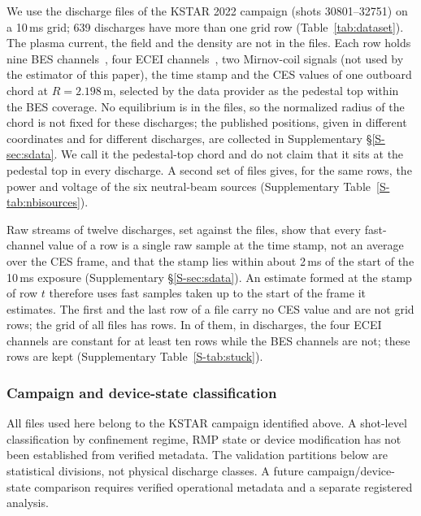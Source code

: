 \documentclass[11pt,a4paper]{article}
\newcommand{\Supp}[1]{Supplementary \S\ref{S-#1}}
\newcommand{\SuppTab}[1]{Supplementary Table~\ref{S-#1}}
\begin{document}
We use the \NFiles{} discharge files of the KSTAR 2022 campaign (shots 30801--32751) on a 10\,ms grid; 639 discharges have more than one grid row (Table~\ref{tab:dataset}). The plasma current, the field and the density are not in the files. Each row holds nine BES channels~\citep{Lampert2015CombinedHydrogen,KFE2026DiagnosticsDataUserGuide}, four ECEI channels~\citep{Yun2010DevelopmentKstar}, two Mirnov-coil signals (not used by the estimator of this paper), the time stamp and the CES values of one outboard chord at $R = 2.198$\,m, selected by the data provider as the pedestal top within the BES coverage. No equilibrium is in the files, so the normalized radius of the chord is not fixed for these discharges; the published positions, given in different coordinates and for different discharges, are collected in \Supp{sec:sdata}. We call it the pedestal-top chord and do not claim that it sits at the pedestal top in every discharge. A second set of files gives, for the same rows, the power and voltage of the six neutral-beam sources (\SuppTab{tab:nbisources}).

\begin{table}[tbp]
  \centering
  \caption{The data set: KSTAR, 2022 campaign, shots 30801--32751, the 635 discharges with scored rows (all 641 files hold 245{,}925 grid rows and 1{,}414 absent steps). Percentiles are over discharges or over rows as stated; the beam line leaves out the 13 files whose power columns of the second beam box are invalid.}
  \label{tab:dataset}
  \TabDataset
\end{table}

Raw streams of twelve discharges, set against the files, show that every fast-channel value of a row is a single raw sample at the time stamp, not an average over the CES frame, and that the stamp lies within about 2\,ms of the start of the 10\,ms exposure (\Supp{sec:sdata}). An estimate formed at the stamp of row $t$ therefore uses fast samples taken up to the start of the frame it estimates. The first and the last row of a file carry no CES value and are not grid rows; the grid of all files has \NGridRows{} rows. In \StuckShare{} of them, in \NStuckDischarges{} discharges, the four ECEI channels are constant for at least ten rows while the BES channels are not; these rows are kept (\SuppTab{tab:stuck}).

\subsubsection{Campaign and device-state classification}
All files used here belong to the KSTAR campaign identified above. A shot-level classification by confinement regime, RMP state or device modification has not been established from verified metadata. The validation partitions below are statistical divisions, not physical discharge classes. A future campaign/device-state comparison requires verified operational metadata and a separate registered analysis.
\end{document}
